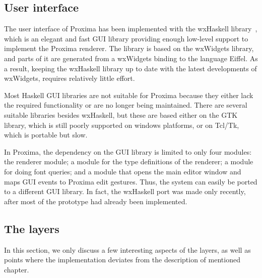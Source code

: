 \subsection{User interface}

The user interface of Proxima has been implemented with the wxHaskell library~\cite{leijen04wxHaskell}, which is  an elegant and fast GUI library providing enough low-level support to implement the Proxima renderer. The library is based on the wxWidgets library, and parts of it are generated from a wxWidgets binding to the language Eiffel. As a result, keeping the wxHaskell library up to date with the latest developments of wxWidgets, requires relatively little effort. 

Most Haskell GUI libraries are not suitable for Proxima because they either lack the required functionality or are no longer being maintained. There are several suitable libraries besides wxHaskell, but these are based either on the GTK library, which is still poorly supported on windows platforms, or on Tcl/Tk, which is portable but slow.

In Proxima, the dependency on the GUI library is limited to only four modules: the renderer module; a module for the type definitions of the renderer; a module for doing font queries; and a module that opens the main editor window and maps GUI events to Proxima edit gestures. Thus, the system can easily be ported to  a different GUI library. In fact, the wxHaskell port was made only recently, after most of the prototype had already been implemented.




\bc
\subsection{The layers}
\toHere

In this section, we only discuss a few interesting aspects of the layers, as well as points where the implementation deviates from the description of mentioned chapter.

